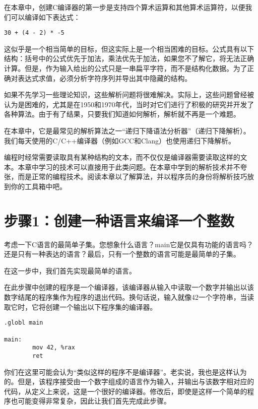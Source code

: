 \documentclass[cn,10pt,math=newtx,citestyle=gb7714-2015,bibstyle=gb7714-2015]{elegantbook}
\begin{document}
在本章中，创建C编译器的第一步是支持四个算术运算和其他算术运算符，以便我们可以编译如下表达式：

\begin{verbatim}
30 + (4 - 2) * -5
\end{verbatim}

这似乎是一个相当简单的目标，但这实际上是一个相当困难的目标。公式具有以下结构：括号中的公式优先于加法，乘法优先于加法，如果您不了解它，将无法正确计算。但是，作为输入给出的公式只是一串扁平字符，而不是结构化数据。为了正确对表达式求值，必须分析字符序列并导出其中隐藏的结构。

如果不先学习一些理论知识，这些解析问题将很难解决。实际上，这些问题曾经被认为是困难的，尤其是在1950和1970年代，当时对它们进行了积极的研究并开发了各种算法。由于有了结果，只要我们知道如何解析，解析就不再是一个难题。

在本章中，它是最常见的解析算法之一“递归下降语法分析器”（递归下降解析）。我们每天使用的C/C++编译器（例如GCC和Clang）也使用递归下降解析。

编程时经常需要读取具有某种结构的文本，而不仅仅是编译器需要读取这样的文本。本章中学习的技术可以直接用于此类问题。在本章中学到的解析技术并不夸张，而是正常的编程技术。阅读本章以了解算法，并以程序员的身份将解析技巧放到你的工具箱中吧。

\section{步骤1：创建一种语言来编译一个整数}

考虑一下C语言的最简单子集。您想象什么语言？main它是仅具有功能的语言吗？还是只有一种表达的语言？最后，只有一个整数的语言可能是最简单的子集。

在这一步中，我们首先实现最简单的语言。

在此步骤中创建的程序是一个编译器，该编译器从输入中读取一个数字并输出以该数字结尾的程序集作为程序的退出代码。换句话说，输入就像42一个字符串，当读取它时，它将创建一个输出以下程序集的编译器。

\begin{verbatim}
.globl main

main:
        mov 42, %rax
        ret
\end{verbatim}

你们在这里可能会认为“类似这样的程序不是编译器”。老实说，我也是这样认为的。但是，该程序接受由一个数字组成的语言作为输入，并输出与该数字相对应的代码，从定义上来说，这是一个很好的编译器。修改后，即使是这样一个简单的程序也可能变得非常复杂，因此让我们首先完成此步骤。
\end{document}
